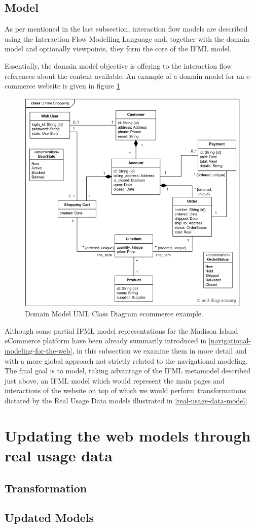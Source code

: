 \subsection{Model}

As per mentioned in the last subsection, interaction flow models are described using the Interaction Flow Modelling Language and, together with the domain model and optionally viewpoints, they form the core of the IFML model.

Essentially, the domain model objective is offering to the interaction flow references about the content available. An example of a domain model for an e-commerce website is given in figure \ref{fig:domain-model-uml-ecommerce}   

\vspace{0.5cm}
\begin{figure}[H]
  \centering
    \includegraphics[width=12cm]{images/diagrams/domain-model-uml-ecommerce.png}
  \caption{Domain Model UML Class Diagram ecommerce example.}
  \label{fig:domain-model-uml-ecommerce}
\end{figure}
\vspace{0.5cm}

Although some partial IFML model representations for the Madison Island eCommerce platform have been already summarily introduced in \ref{navigational-modeling-for-the-web}, in this subsection we examine them in more detail and with a more global approach not strictly related to the navigational modeling. The final goal is to model, taking advantage of the IFML metamodel described just above, an IFML model which would represent the main pages and interactions of the website on top of which we would perform transformations dictated by the Real Usage Data models illustrated in \ref{real-usage-data-model}

\section{Updating the web models through real usage data}

\subsection{Transformation}

\subsection{Updated Models}
